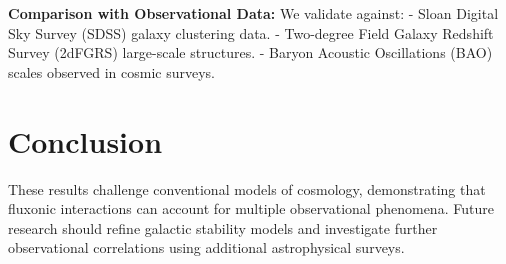 \documentclass{article}
\begin{document}
\textbf{Comparison with Observational Data:}
We validate against:
- Sloan Digital Sky Survey (SDSS) galaxy clustering data.
- Two-degree Field Galaxy Redshift Survey (2dFGRS) large-scale structures.
- Baryon Acoustic Oscillations (BAO) scales observed in cosmic surveys.

\section{Conclusion}
These results challenge conventional models of cosmology, demonstrating that fluxonic interactions can account for multiple observational phenomena. Future research should refine galactic stability models and investigate further observational correlations using additional astrophysical surveys.
\end{document}
